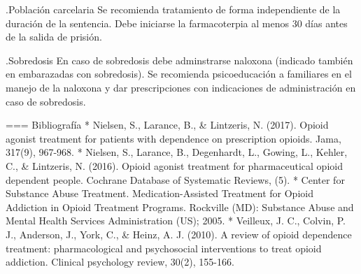 .Población carcelaria
Se recomienda tratamiento de forma independiente de la duración de la sentencia.
Debe iniciarse la farmacoterpia al menos 30 días antes de la salida de prisión.

.Sobredosis
En caso de sobredosis debe adminstrarse naloxona (indicado también en embarazadas con sobredosis).
Se recomienda psicoeducación a familiares en el manejo de la naloxona y dar prescripciones con indicaciones de administración en caso de sobredosis.

=== Bibliografía
* Nielsen, S., Larance, B., \& Lintzeris, N. (2017). Opioid agonist treatment for patients with dependence on prescription opioids. Jama, 317(9), 967-968.
* Nielsen, S., Larance, B., Degenhardt, L., Gowing, L., Kehler, C., \& Lintzeris, N. (2016). Opioid agonist treatment for pharmaceutical opioid dependent people. Cochrane Database of Systematic Reviews, (5).
* Center for Substance Abuse Treatment. Medication-Assisted Treatment for Opioid Addiction in Opioid Treatment Programs. Rockville (MD): Substance Abuse and Mental Health Services Administration (US); 2005.
* Veilleux, J. C., Colvin, P. J., Anderson, J., York, C., \& Heinz, A. J. (2010). A review of opioid dependence treatment: pharmacological and psychosocial interventions to treat opioid addiction. Clinical psychology review, 30(2), 155-166.
